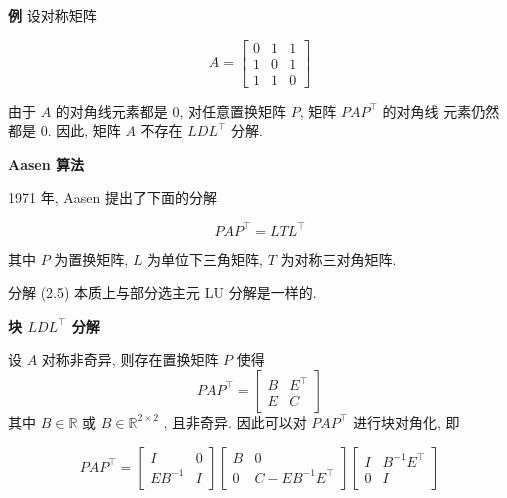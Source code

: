 \documentclass[12pt,a4paper]{article}
\begin{document}
\begin{framed}
{\bfseries 例} 设对称矩阵

\begin{equation}
A=\left[\begin{array}{lll}{0} & {1} & {1} \\ {1} & {0} & {1} \\ {1} & {1} & {0}\end{array}\right]
\end{equation}

由于 $A$ 的对角线元素都是 $0$, 对任意置换矩阵 $P$, 矩阵 $P AP^{\top}$ 的对角线
元素仍然都是 $0$. 因此, 矩阵 $A$ 不存在 $LDL^{\top}$ 分解.

\end{framed}

{\bfseries Aasen 算法}

1971 年, Aasen 提出了下面的分解

\begin{equation}
P A P^{\top}=L T L^{\top}
\end{equation}

其中 $P$ 为置换矩阵, $L$ 为单位下三角矩阵, $T$ 为对称三对角矩阵.

分解 (2.5) 本质上与部分选主元 LU 分解是一样的.

{\bfseries 块 $LDL^{\top}$ 分解} 

设 $A$ 对称非奇异, 则存在置换矩阵 $P$ 使得
\begin{equation}
P A P^{\top}=\left[\begin{array}{cc}{B} & {E^{\top}} \\ {E} & {C}\end{array}\right]
\end{equation}
其中 $B ∈ \mathbb{R}$ 或 $B ∈ \mathbb{R}^{2×2}$
, 且非奇异. 因此可以对 $P AP^{\top}$ 进行块对角化, 即

\begin{equation}
P A P^{\top}=\left[\begin{array}{cc}{I} & {0} \\ {E B^{-1}} & {I}\end{array}\right]\left[\begin{array}{cc}{B} & {0} \\ {0} & {C-E B^{-1} E^{\top}}\end{array}\right]\left[\begin{array}{cc}{I} & {B^{-1} E^{\top}} \\ {0} & {I}\end{array}\right]
\end{equation}
\end{document}
